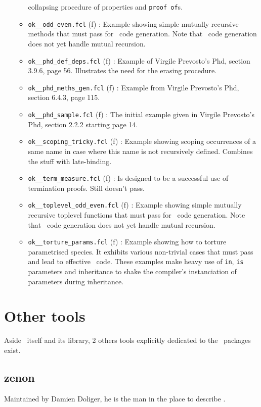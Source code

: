 \begin{itemize}
\begin{itemize}
      collapsing procedure of properties and {\tt proof of}s.
    \item {\tt ok\_\_odd\_even.fcl} (f) : Example showing simple
      mutually recursive methods that must pass for \ocaml\ code
      generation. Note that \coq\ code generation does not yet handle
      mutual recursion.
    \item {\tt ok\_\_phd\_def\_deps.fcl} (f) : Example of Virgile
      Prevosto's Phd, section 3.9.6, page 56. Illustrates the need for
      the erasing procedure.
    \item {\tt ok\_\_phd\_meths\_gen.fcl} (f) : Example from Virgile
      Prevosto's Phd, section 6.4.3, page 115.
    \item {\tt ok\_\_phd\_sample.fcl} (f) : The initial example given
      in Virgile Prevosto's Phd, section 2.2.2 starting page 14.
    \item {\tt ok\_\_scoping\_tricky.fcl} (f) : Example showing
      scoping occurrences of a same name in case where this name is not
      recursively defined. Combines the stuff with late-binding.
    \item {\tt ok\_\_term\_measure.fcl} (f) : Is designed to be a
      successful use of termination proofs. Still doesn't pass.
    \item {\tt ok\_\_toplevel\_odd\_even.fcl} (f) : Example showing
      simple  mutually recursive toplevel functions that must pass for
      \ocaml\ code generation. Note that \coq\ code generation does
      not yet handle mutual recursion.
    \item {\tt ok\_\_torture\_params.fcl} (f) : Example showing how to
      torture parametrised species. It exhibits various non-trivial
      cases that must pass and lead to effective \ocaml\/\coq\
      code. These examples make heavy use of {\tt in}, {\tt is}
      parameters and inheritance to shake the compiler's instanciation
      of parameters during inheritance.
  \end{itemize}
\end{itemize}

\section{Other tools}
Aside \focalizec\ itself and its library, 2 others tools explicitly
dedicated to the \focalize\ packages exist.

\subsection{zenon}
Maintained by Damien Doliger, he is the man in the place to describe
\smiley.

